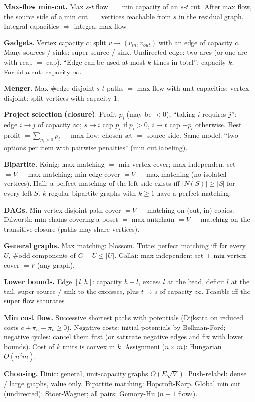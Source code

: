 {\scriptsize
\setlength{\parskip}{2pt}
\textbf{Max-flow min-cut.} Max $s$-$t$ flow $=$ min capacity of an $s$-$t$
cut. After max flow, the source side of a min cut $=$ vertices reachable
from $s$ in the residual graph. Integral capacities $\Rightarrow$ integral
max flow.

\textbf{Gadgets.} Vertex capacity $c$: split $v\to(v_{in},v_{out})$ with an
edge of capacity $c$. Many sources / sinks: super source / sink.
Undirected edge: two arcs (or one arc with rcap $=$ cap). ``Edge can be used
at most $k$ times in total'': capacity $k$. Forbid a cut: capacity $\infty$.

\textbf{Menger.} Max \#edge-disjoint $s$-$t$ paths $=$ max flow with unit
capacities; vertex-disjoint: split vertices with capacity 1.

\textbf{Project selection (closure).} Profit $p_i$ (may be $<0$), ``taking
$i$ requires $j$'': edge $i\to j$ of capacity $\infty$; $s\to i$ cap $p_i$ if
$p_i>0$, $i\to t$ cap $-p_i$ otherwise. Best profit $=\sum_{p_i>0}p_i-$
max flow; chosen set $=$ source side. Same model: ``two options per item
with pairwise penalties'' (min cut labeling).

\textbf{Bipartite.} K\"onig: max matching $=$ min vertex cover; max
independent set $=V-$ max matching; min edge cover $=V-$ max matching (no
isolated vertices). Hall: a perfect matching of the left side exists iff
$|N(S)|\ge|S|$ for every left $S$. $k$-regular bipartite graphs with $k\ge1$
have a perfect matching.

\textbf{DAGs.} Min vertex-disjoint path cover $=V-$ matching on (out, in)
copies. Dilworth: min chains covering a poset $=$ max antichain $=V-$
matching on the transitive closure (paths may share vertices).

\textbf{General graphs.} Max matching: blossom. Tutte: perfect matching
iff for every $U$, \#odd components of $G-U\le|U|$. Gallai: max
independent set $+$ min vertex cover $=V$ (any graph).

\textbf{Lower bounds.} Edge $[l,h]$: capacity $h-l$, excess $l$ at the head,
deficit $l$ at the tail, super source / sink to the excesses, plus $t\to s$
of capacity $\infty$. Feasible iff the super flow saturates.

\textbf{Min cost flow.} Successive shortest paths with potentials (Dijkstra
on reduced costs $c+\pi_u-\pi_v\ge0$). Negative costs: initial potentials by
Bellman-Ford; negative cycles: cancel them first (or saturate negative
edges and fix with lower bounds). Cost of $k$ units is convex in $k$.
Assignment ($n\times m$): Hungarian $O(n^2m)$.

\textbf{Choosing.} Dinic: general, unit-capacity graphs
$O(E\sqrt V)$. Push-relabel: dense / large graphs, value only. Bipartite
matching: Hopcroft-Karp. Global min cut (undirected): Stoer-Wagner; all
pairs: Gomory-Hu ($n-1$ flows).
}
